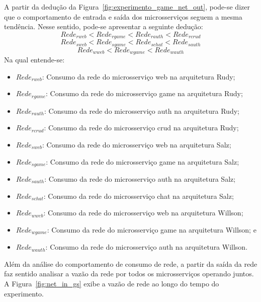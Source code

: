 A partir da dedução da Figura~\ref{fig:experimento_game_net_out}, pode-se dizer que o comportamento de entrada e saída dos microsserviços seguem a mesma tendência.
%
Nesse sentido, pode-se apresentar a seguinte dedução:
\vspace{-0.3cm}
$$
     Rede_{rweb} < Rede_{rgame} < Rede_{rauth} < Rede_{rcrud}
$$
\vspace{-0.3cm}
$$
     Rede_{sweb} < Rede_{sgame} < Rede_{schat} < Rede_{sauth}
$$
\vspace{-0.3cm}
$$
     Rede_{wweb} < Rede_{wgame} < Rede_{wauth}
$$
\vspace{-0.3cm}
Na qual entende-se:
\vspace{-0.3cm}
\begin{itemize}
 \item $Rede_{rweb}$: Consumo da rede do microsserviço web na arquitetura Rudy;
 \item $Rede_{rgame}$: Consumo da rede do microsserviço game na arquitetura Rudy;
 \item $Rede_{rauth}$: Consumo da rede do microsserviço auth na arquitetura Rudy;
 \item $Rede_{rcrud}$: Consumo da rede do microsserviço crud na arquitetura Rudy;
  \item $Rede_{sweb}$: Consumo da rede do microsserviço web na arquitetura Salz;
 \item $Rede_{sgame}$: Consumo da rede do microsserviço game na arquitetura Salz;
 \item $Rede_{sauth}$: Consumo da rede do microsserviço auth na arquitetura Salz;
 \item $Rede_{schat}$: Consumo da rede do microsserviço chat na arquitetura Salz;
 \item $Rede_{wweb}$: Consumo da rede do microsserviço web na arquitetura Willson;
 \item $Rede_{wgame}$: Consumo da rede do microsserviço game na arquitetura Willson; e
 \item $Rede_{wauth}$: Consumo da rede do microsserviço auth na arquitetura Willson.
\end{itemize}

Além da análise do comportamento de consumo de rede, a partir da saída da rede faz sentido analisar a vazão da rede por todos os microsserviços operando juntos.
%
A Figura~\ref{fig:net_in_gs} exibe a vazão de rede ao longo do tempo do experimento.

